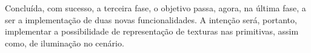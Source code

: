 Concluída, com sucesso, a terceira fase, o objetivo passa, agora,
na última fase, a ser a implementação de duas novas funcionalidades.
\newline
\break
\noindent
A intenção será, portanto, implementar a possibilidade de representação
de texturas nas primitivas, assim como, de iluminação no cenário.